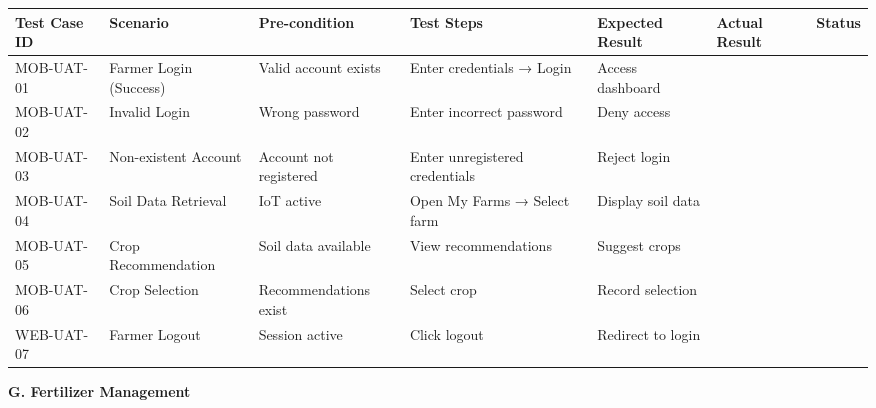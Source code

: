 {\begin{table}[H]
		\begin{adjustbox}{max width=\textwidth}
			\begin{tabular}{p{2cm}p{3cm}p{3cm}p{3cm}p{4cm}p{4cm}p{1.5cm}}
				\toprule
				\textbf{Test Case ID} & \textbf{Scenario} & \textbf{Pre-condition} & \textbf{Test Steps} & \textbf{Expected Result} & \textbf{Actual Result} & \textbf{Status} \\
				\midrule
				MOB-UAT-01 & Farmer Login (Success) & Valid account exists & Enter credentials → Login & Access dashboard & & \\
				MOB-UAT-02 & Invalid Login & Wrong password & Enter incorrect password & Deny access & & \\
				MOB-UAT-03 & Non-existent Account & Account not registered & Enter unregistered credentials & Reject login & & \\
				MOB-UAT-04 & Soil Data Retrieval & IoT active & Open My Farms → Select farm & Display soil data & & \\
				MOB-UAT-05 & Crop Recommendation & Soil data available & View recommendations & Suggest crops & & \\
				MOB-UAT-06 & Crop Selection & Recommendations exist & Select crop & Record selection & & \\
				WEB-UAT-07 & Farmer Logout & Session active & Click logout & Redirect to login & & \\
				\bottomrule
			\end{tabular}
		\end{adjustbox}
	\end{table}
	
	
	\begin{table}[H]
		\centering
		\renewcommand{\arraystretch}{1.2}
		\caption*{\textbf{G. Fertilizer Management}}
		

\end{table}}
